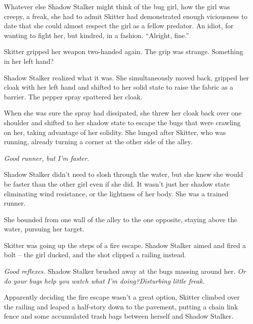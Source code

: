 Whatever else Shadow Stalker might think of the bug girl, how the girl was creepy, a freak, she had to admit Skitter had demonstrated enough viciousness to date that she could almost respect the girl as a fellow predator.  An idiot, for wanting to fight her, but kindred, in a fashion.  ``Alright, fine.''



Skitter gripped her weapon two-handed again.  The grip was strange.  Something in her left hand?



Shadow Stalker realized what it was.  She simultaneously moved back, gripped her cloak with her left hand and shifted to her solid state to raise the fabric as a barrier.  The pepper spray spattered her cloak.



When she was sure the spray had dissipated, she threw her cloak back over one shoulder and shifted to her shadow state to escape the bugs that were crawling on her, taking advantage of her solidity.   She lunged after Skitter, who was running, already turning a corner at the other side of the alley.



\emph{Good runner, but I'm faster}.



Shadow Stalker didn't need to slosh through the water, but she knew she would be faster than the other girl even if she did.  It wasn't just her shadow state eliminating wind resistance, or the lightness of her body.  She was a trained runner.



She bounded from one wall of the alley to the one opposite, staying above the water, pursuing her target.



Skitter was going up the steps of a fire escape.  Shadow Stalker aimed and fired a bolt – the girl ducked, and the shot clipped a railing instead.



\emph{Good reflexes.  }Shadow Stalker brushed away at the bugs massing around her.  \emph{Or do your bugs help you watch what I'm doing?}\emph{Disturbing little freak}.



Apparently deciding the fire escape wasn't a great option, Skitter climbed over the railing and leaped a half-story down to the pavement, putting a chain link fence and some accumulated trash bags between herself and Shadow Stalker.



